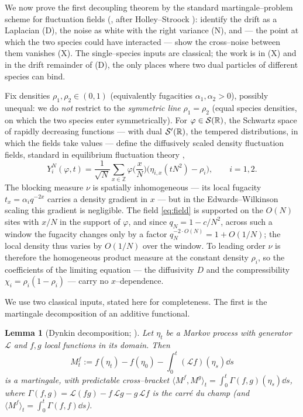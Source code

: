 \documentclass[11pt]{article}
\theoremstyle{plain}
\newtheorem{lemma}[theorem]{Lemma}
\theoremstyle{definition}
\theoremstyle{remark}
\newcommand{\Z}{\mathbb{Z}}\newcommand{\R}{\mathbb{R}}\newcommand{\N}{\mathbb{N}}
\newcommand{\cL}{\mathcal L}\newcommand{\cO}{\mathcal O}\newcommand{\cE}{\mathcal E}
\begin{document}
We now prove the first decoupling theorem by the standard martingale--problem scheme for
fluctuation fields (\cite[Ch.~11]{KL}, after Holley--Stroock \cite{HolleyStroock}):
identify the drift as a Laplacian (D), the noise as white with the
right variance (N), and --- the point at which the two species could have interacted ---
show the cross--noise between them vanishes (X). The single--species inputs are
classical; the work is in (X) and in the drift remainder of (D), the only places where
two dual particles of different species can bind.

Fix densities $\rho_1,\rho_2\in(0,1)$ (equivalently fugacities $\alpha_1,\alpha_2>0$),
possibly unequal: we do \emph{not} restrict to the \emph{symmetric line} $\rho_1=\rho_2$
(equal species densities, on which the two species enter symmetrically). For
$\varphi\in\cS(\R)$, the Schwartz space of rapidly decreasing functions --- with dual
$\cS'(\R)$, the tempered distributions, in which the fields take values --- define the
diffusively scaled density fluctuation fields, standard in equilibrium fluctuation
theory \cite[Ch.~11]{KL},
\begin{equation}\label{eq:field}
  Y_i^N(\varphi,t)=\frac1{\sqrt N}\sum_{x\in\Z}\varphi\Big(\frac xN\Big)
   \big(\eta_{i,x}(tN^2)-\rho_i\big),\qquad i=1,2.
\end{equation}
The blocking measure $\nu$ is spatially inhomogeneous --- its local fugacity
$t_x=\alpha_i q^{-2x}$ carries a density gradient in $x$ --- but in the
Edwards--Wilkinson scaling this gradient is negligible. The field \eqref{eq:field} is
supported on the $O(N)$ sites with $x/N$ in the support of $\varphi$, and since
$q_N=1-c/N^2$, across such a window the fugacity changes only by a factor
$q_N^{-2\cdot O(N)}=1+O(1/N)$; the local density thus varies by $O(1/N)$ over the
window. To leading order $\nu$ is therefore the homogeneous product measure at the
constant density $\rho_i$, so the coefficients of the limiting equation --- the
diffusivity $D$ and the compressibility $\chi_i=\rho_i(1-\rho_i)$ --- carry no
$x$--dependence.

We use two classical inputs, stated here for completeness. The first is the martingale
decomposition of an additive functional.

\begin{lemma}[Dynkin decomposition; {\cite[App.~1.5]{KL}}]\label{lem:dynkin}
Let $\eta_t$ be a Markov process with generator $\cL$ and $f,g$ local functions in its
domain. Then
\[
  M^f_t:=f(\eta_t)-f(\eta_0)-\int_0^t(\cL f)(\eta_s)\dd s
\]
is a martingale, with predictable cross--bracket
$\langle M^f,M^g\rangle_t=\int_0^t\Gamma(f,g)(\eta_s)\dd s$, where
$\Gamma(f,g)=\cL(fg)-f\,\cL g-g\,\cL f$ is the carr\'e du champ (and
$\langle M^f\rangle_t=\int_0^t\Gamma(f,f)\dd s$).
\end{lemma}
\end{document}
